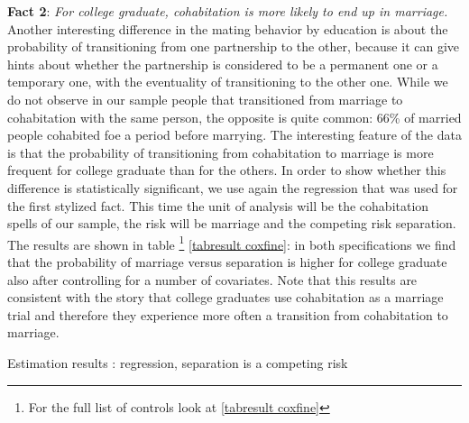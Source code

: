 \documentclass[12pt]{article}
\begin{document}
\FloatBarrier
\textbf{Fact 2}: \textit{For college graduate, cohabitation is more likely to end up in marriage.}\\
 Another interesting difference in the mating behavior by education is about the probability of transitioning from one partnership to the other, because it can give hints about whether the partnership is considered to be a permanent one or a temporary one, with the eventuality of transitioning to the other one. While we do not observe in our sample people that transitioned from marriage to cohabitation with the same person, the opposite is quite common: 66\% of married people cohabited foe a period before marrying.
 The interesting feature of the data is that the probability of transitioning from cohabitation to marriage is more frequent for college graduate than for the others.
 In order to show whether this difference is statistically significant, we use again the 
 \citet{fine1999} regression that was used for the first stylized fact. This time the unit of analysis will be the cohabitation spells of our sample, the risk will be marriage and the competing risk separation. The results are shown in table \footnote{For the full list of controls look at \autoref{tabresult coxfine}} \autoref{tabresult coxfine}: in both specifications we find that the probability of marriage versus separation is higher for college graduate also after controlling for a number of covariates. Note that this results are consistent with the story that college graduates use cohabitation as a marriage trial and therefore they experience more often a transition from cohabitation to marriage.\\
{	
	\def\onepc{$^{\ast\ast}$} \def\fivepc{$^{\ast}$}
	\def\tenpc{$^{\dag}$}
	\def\legend{\multicolumn{3}{l}{\footnotesize{Significance levels
				:\hspace{1em} $\ast$ : 10\% \hspace{1em}
				$\ast\ast$ : 5\% \hspace{1em} $\ast\ast\ast$ : 1\% \normalsize}}}
	\begin{table}[htbp]\centering
		\caption{Estimation results : \citet{fine1999} regression, separation is a competing risk
			\label{tabresult coxfineshort}}
		
	\end{table}
}
\FloatBarrier
\end{document}
